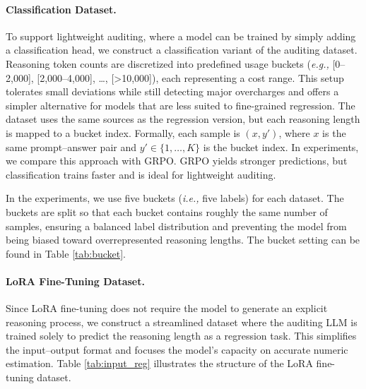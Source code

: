 \documentclass[pdflatex,sn-mathphys-num]{sn-jnl}%
\newcommand{\eg}{\textit{e.g., }}
\newcommand{\ie}{\textit{i.e., }}
\theoremstyle{thmstyleone}%
\theoremstyle{thmstyletwo}%
\theoremstyle{thmstylethree}%
\begin{document}
\paragraph{Classification Dataset.} To support lightweight auditing, where a model can be trained by simply adding a classification head, we construct a classification variant of the auditing dataset. Reasoning token counts are discretized into predefined usage buckets (\eg [0–2,000], [2,000–4,000], …, [\textgreater 10,000]), each representing a cost range. This setup tolerates small deviations while still detecting major overcharges and offers a simpler alternative for models that are less suited to fine-grained regression. The dataset uses the same sources as the regression version, but each reasoning length is mapped to a bucket index. Formally, each sample is \((x, y')\), where \(x\) is the same prompt–answer pair and \(y' \in \{1, \dots, K\}\) is the bucket index. In experiments, we compare this approach with GRPO. GRPO yields stronger predictions, but classification trains faster and is ideal for lightweight auditing.

In the experiments, we use five buckets (\ie five labels) for each dataset. The buckets are split so that each bucket contains roughly the same number of samples, ensuring a balanced label distribution and preventing the model from being biased toward overrepresented reasoning lengths. The bucket setting can be found in Table \ref{tab:bucket}.

\paragraph{LoRA Fine-Tuning Dataset.}
Since LoRA fine-tuning does not require the model to generate an explicit reasoning process, we construct a streamlined dataset where the auditing LLM is trained solely to predict the reasoning length as a regression task. This simplifies the input–output format and focuses the model’s capacity on accurate numeric estimation. Table \ref{tab:input_reg} illustrates the structure of the LoRA fine-tuning dataset.
\end{document}
